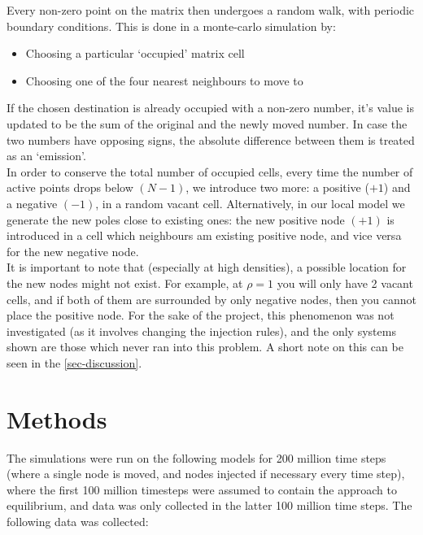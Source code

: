 \documentclass[aps, pre, reprint]{revtex4-2}
\begin{document}
Every non-zero point on the matrix then undergoes a random walk, with periodic boundary conditions. This is done in a monte-carlo simulation by:
\begin{itemize}
    \item Choosing a particular `occupied' matrix cell
    \item Choosing one of the four nearest neighbours to move to
\end{itemize}
If the chosen destination is already occupied with a non-zero number, it's value is updated to be the sum of the original and the newly moved number. In case the two numbers have opposing signs, the absolute difference between them is treated as an `emission'. \\

In order to conserve the total number of occupied cells, every time the number of active points drops below $\left(N-1\right)$, we introduce two more: a positive ($+1$) and a negative $(-1)$, in a random vacant cell. Alternatively, in our local model we generate the new poles close to existing ones: the new positive node $(+1)$ is introduced in a cell which neighbours am existing positive node, and vice versa for the new negative node. \\

It is important to note that (especially at high densities), a possible location for the new nodes might not exist. For example, at $\rho=1$ you will only have 2 vacant cells, and if both of them are surrounded by only negative nodes, then you cannot place the positive node. For the sake of the project, this phenomenon was not investigated (as it involves changing the injection rules), and the only systems shown are those which never ran into this problem. A short note on this can be seen in the \autoref{sec-discussion}.

\section{Methods}

The simulations were run on the following models for 200 million time steps (where a single node is moved, and nodes injected if necessary every time step), where the first 100 million timesteps were assumed to contain the approach to equilibrium, and data was only collected in the latter 100 million time steps. The following data was collected:
\end{document}

